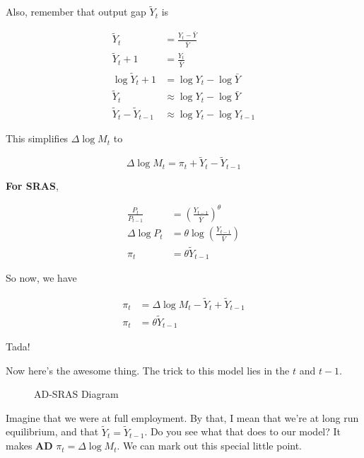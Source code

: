 \documentclass[11pt]{scrartcl}
\newcommand{\og}{\ensuremath{\tilde{Y}}}
\begin{document}
Also, remember that output gap $\og_t$ is

\begin{align*}
\og_t &= \frac{Y_t - \bar{Y}}{\bar{Y}} \\
\og_t + 1 &= \frac{Y_t}{\bar{Y}} \\
\log{\og_t + 1} &= \log{Y_t} - \log{\bar{Y}} \\
\og_t &\approx \log{Y_t} - \log{\bar{Y}} \\
\og_t - \og_{t-1} &\approx \log{Y_t} - \log{Y_{t-1}} 
\end{align*}

This simplifies $\Delta \log{M_t}$ to

\[ \Delta \log{M_t} = \pi_t + \og_t - \og_{t-1} \]

\textbf{For SRAS}, 

\begin{align*}
\frac{P_{t}}{P_{t-1}} &= \left(\frac{Y_{t-1}}{\bar{Y}}\right)^\theta \\
\Delta \log{P_t} &= \theta \log{\left( \frac{Y_{t-1}}{\bar{V}} \right)} \\
\pi_t &= \theta \og_{t-1}
\end{align*}

So now, we have

\begin{align*}
\pi_t  &= \Delta \log{M_t} - \og_t + \og_{t-1} \\
\pi_t &= \theta \og_{t-1}
\end{align*}

Tada!

Now here's the awesome thing. The trick to this model lies in the $t$ and $t-1$.

\begin{figure}[H]
\centering
{}
\caption{\color{blue}AD-\color{black}SRAS Diagram}
\end{figure}

Imagine that we were at full employment. By that, I mean that we're at long run equilibrium, and that $\og_t = \og_{t-1}$. Do you see what that does to our model? It makes \textbf{AD} $\pi_t = \Delta \log{M_t}$. We can mark out this special little point.
\end{document}
